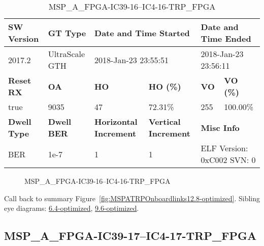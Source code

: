 \begin{table}[h]
\centering
\caption{MSP\_A\_FPGA-IC39-16--IC4-16-TRP\_FPGA}
\label{tab:MSPAFPGAIC3916IC416TRPFPGA12.8-optimized}
\begin{tabular}{@{}|l|l|l|l|l|l|@{}}
\toprule
\textbf{SW Version}                & \textbf{GT Type}   & \multicolumn{2}{l|}{\textbf{Date and Time Started}}            & \multicolumn{2}{l|}{\textbf{Date and Time Ended}}        \\ \midrule
2017.2                       & UltraScale GTH          & \multicolumn{2}{l|}{2018-Jan-23 23:55:51}                   & \multicolumn{2}{l|}{2018-Jan-23 23:56:11}               \\ \midrule
\textbf{Reset RX}                  & \textbf{OA} & \textbf{HO}   & \textbf{HO (\%)} & \textbf{VO} & \textbf{VO (\%)} \\ \midrule
true & 9035        & 47          & 72.31\%        & 255        & 100.00\%       \\ \midrule
\textbf{Dwell Type}                & \textbf{Dwell BER} & \textbf{Horizontal Increment} & \textbf{Vertical Increment}    & \multicolumn{2}{l|}{\textbf{Misc Info}}                  \\ \midrule
BER                            & 1e-7        & 1        & 1           & \multicolumn{2}{l|}{ELF Version: 0xC002 SVN: 0}                         \\ \bottomrule
\end{tabular}
\end{table}

\begin{figure}[h]
\caption{MSP\_A\_FPGA-IC39-16--IC4-16-TRP\_FPGA} \label{fig:MSPAFPGAIC3916IC416TRPFPGA12.8-optimized}
\end{figure}

Call back to summary Figure~\ref{fig:MSPATRPOnboardlinks12.8-optimized}.
Sibling eye diagrams: \hyperref[sec:MSPAFPGAIC3916IC416TRPFPGA6.4-optimized]{6.4-optimized}, \hyperref[sec:MSPAFPGAIC3916IC416TRPFPGA9.6-optimized]{9.6-optimized}.

\clearpage
\newpage


\subsection{MSP\_A\_FPGA-IC39-17--IC4-17-TRP\_FPGA}\label{sec:MSPAFPGAIC3917IC417TRPFPGA12.8-optimized}

